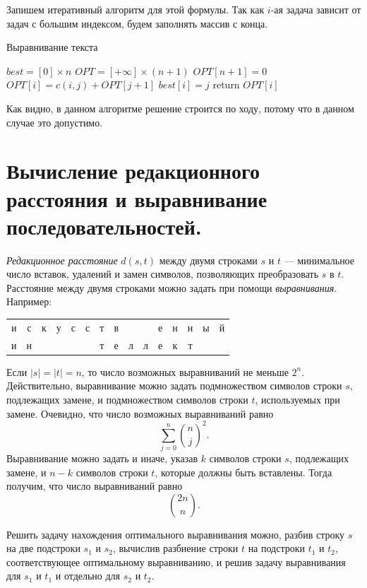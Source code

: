 \documentclass[a4paper,12pt]{article}
\begin{document}
Запишем итеративный алгоритм для этой формулы.
Так как $i$-ая задача зависит от задач с большим индексом, будем заполнять массив с конца.

\begin{algorithm}
	\caption{Выравнивание текста}
	\begin{algorithmic}
			\State \(best = [0] \times n\)
			\State \(OPT = [+\infty] \times (n + 1)\)
			\State $OPT[n + 1] = 0$
						\State \(OPT[i] = c(i, j) + OPT[j + 1]\)
						\State \(best[i] = j\)
					\EndIf
				\EndFor
			\EndFor
			\State return $OPT[i]$
		\EndFunction
	\end{algorithmic}
\end{algorithm}

Как видно, в данном алгоритме решение строится по ходу, потому что в данном случае это допустимо.

\newpage
\section{Вычисление редакционного расстояния и выравнивание последовательностей.}

\emph{Редакционное расстояние} $d(s, t)$ между двумя строками $s$ и $t$ --- минимальное число вставок, удалений и замен символов, позволяющих преобразовать $s$ в $t$. Расстояние между двумя строками можно задать при помощи \emph{выравнивания}. Например:

\begin{center}
\begin{tabular}{ccccccccccccccc}
	и&с&к&у&с&с&т&в&&&е&н&н&ы&й\\
	и&н&&&&&т&е&л&л&е&к&т
\end{tabular}
\end{center}

Если $|s| = |t| = n$, то число возможных выравниваний не меньше $2^n$. Действительно, выравнивание можно задать подмножеством символов строки $s$, подлежащих замене, и подмножеством  символов строки $t$, используемых при замене. Очевидно, что число возможных выравниваний равно \[\sum_{j=0}^n \binom{n}{j}^2.\]
Выравнивание можно задать и иначе, указав $k$ символов строки $s$, подлежащих замене, и $n - k$ символов строки $t$, которые должны быть вставлены. Тогда получим, что число выравниваний равно\[\binom{2n}{n}.\]

Решить задачу нахождения оптимального выравнивания можно, разбив строку $s$ на две подстроки $s_1$ и $s_2$, вычислив разбиение строки $t$ на подстроки $t_1$ и $t_2$, соответствующее оптимальному выравниванию, и решив задачу выравнивания для $s_1$ и $t_1$ и отдельно для $s_2$ и $t_2$.
\end{document}
